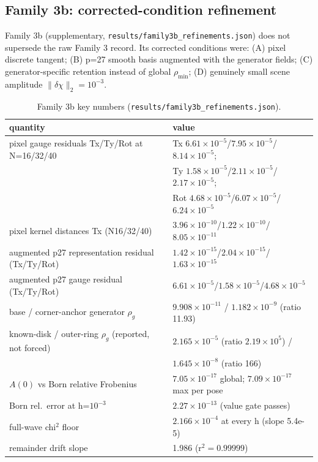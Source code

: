 \documentclass[12pt]{article}
\begin{document}
\subsection{Family 3b: corrected-condition refinement}\label{sec:family3b}

Family 3b (supplementary, \texttt{results/family3b\_refinements.json}) does not
supersede the raw Family 3 record. Its corrected conditions were: (A) pixel
discrete tangent; (B) p=27 smooth basis augmented with the generator fields;
(C) generator-specific retention instead of global $\rho_{\min}$; (D)
genuinely small scene amplitude $\|\delta\chi\|_2=10^{-3}$.

\begin{table}[ht]
\centering
\small
\caption{Family 3b key numbers (\texttt{results/family3b\_refinements.json}).}
\label{tab:f3b}
\begin{tabular}{l l}
\toprule
quantity & value \\
\midrule
pixel gauge residuals Tx/Ty/Rot at N=16/32/40 &
Tx $6.61\times10^{-5}$/$7.95\times10^{-5}$/$8.14\times10^{-5}$; \\
 & Ty $1.58\times10^{-5}$/$2.11\times10^{-5}$/$2.17\times10^{-5}$; \\
 & Rot $4.68\times10^{-5}$/$6.07\times10^{-5}$/$6.24\times10^{-5}$ \\
pixel kernel distances Tx (N16/32/40) &
$3.96\times10^{-10}$/$1.22\times10^{-10}$/$8.05\times10^{-11}$ \\
augmented p27 representation residual (Tx/Ty/Rot) &
$1.42\times10^{-15}$/$2.04\times10^{-15}$/$1.63\times10^{-15}$ \\
augmented p27 gauge residual (Tx/Ty/Rot) &
$6.61\times10^{-5}$/$1.58\times10^{-5}$/$4.68\times10^{-5}$ \\
base / corner-anchor generator $\rho_g$ &
$9.908\times10^{-11}$ / $1.182\times10^{-9}$ (ratio 11.93) \\
known-disk / outer-ring $\rho_g$ (reported, not forced) &
$2.165\times10^{-5}$ (ratio $2.19\times10^5$) / \\
 & $1.645\times10^{-8}$ (ratio 166) \\
$A(0)$ vs Born relative Frobenius &
$7.05\times10^{-17}$ global; $7.09\times10^{-17}$ max per pose \\
Born rel.\ error at h=$10^{-3}$ &
$2.27\times10^{-13}$ (value gate passes) \\
full-wave chi$^2$ floor & $2.166\times10^{-4}$ at every h (slope 5.4e-5) \\
remainder drift slope & 1.986 (r$^2=0.99999$) \\
\bottomrule
\end{tabular}
\end{table}
\end{document}
